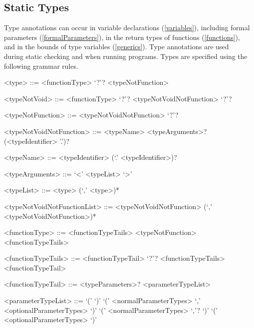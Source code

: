 \documentclass[makeidx]{article}
\begin{document}
{\subsection{Static Types}

\LMHash{}%
Type annotations can occur in variable declarations (\ref{variables}),
including formal parameters (\ref{formalParameters}),
in the return types of functions (\ref{functions}),
and in the bounds of type variables (\ref{generics}).
Type annotations are used during static checking and when running programs.
Types are specified using the following grammar rules.



\begin{grammar}

<type> ::= <functionType> `?'?
  \alt <typeNotFunction>

<typeNotVoid> ::= <functionType> `?'?
  \alt <typeNotVoidNotFunction> `?'?

<typeNotFunction> ::= \VOID{}
  \alt <typeNotVoidNotFunction> `?'?

<typeNotVoidNotFunction> ::= <typeName> <typeArguments>?
  \alt (<typeIdentifier> '.')? \FUNCTION{}

<typeName> ::= <typeIdentifier> (`.' <typeIdentifier>)?

<typeArguments> ::= `<' <typeList> `>'

<typeList> ::= <type> (`,' <type>)*

<typeNotVoidNotFunctionList> ::= \gnewline{}
  <typeNotVoidNotFunction> (`,' <typeNotVoidNotFunction>)*

<functionType> ::= <functionTypeTails>
  \alt <typeNotFunction> <functionTypeTails>

<functionTypeTails> ::= <functionTypeTail> `?'? <functionTypeTails>
  \alt <functionTypeTail>

<functionTypeTail> ::= \FUNCTION{} <typeParameters>? <parameterTypeList>

<parameterTypeList> ::= `(' `)'
  \alt `(' <normalParameterTypes> `,' <optionalParameterTypes> `)'
  \alt `(' <normalParameterTypes> `,'? `)'
  \alt `(' <optionalParameterTypes> `)'


\end{grammar}}
\end{document}
